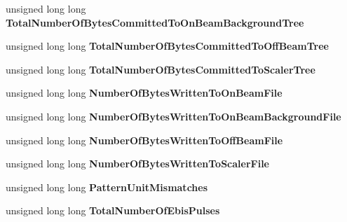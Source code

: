 \begin{DoxyCompactItemize}
\item 
\hypertarget{class_event_builder_a806f1763408486a9f46ff3a521476ca8}{unsigned long long {\bfseries Total\-Number\-Of\-Bytes\-Committed\-To\-On\-Beam\-Background\-Tree}}\label{class_event_builder_a806f1763408486a9f46ff3a521476ca8}

\item 
\hypertarget{class_event_builder_a66ea0d8b3123cc4cd3458528d30f17b6}{unsigned long long {\bfseries Total\-Number\-Of\-Bytes\-Committed\-To\-Off\-Beam\-Tree}}\label{class_event_builder_a66ea0d8b3123cc4cd3458528d30f17b6}

\item 
\hypertarget{class_event_builder_ab65f8dae52a68a6c61bc1e1e1bae996b}{unsigned long long {\bfseries Total\-Number\-Of\-Bytes\-Committed\-To\-Scaler\-Tree}}\label{class_event_builder_ab65f8dae52a68a6c61bc1e1e1bae996b}

\item 
\hypertarget{class_event_builder_a638590f2a3784f3a7208a1862fdde67c}{unsigned long long {\bfseries Number\-Of\-Bytes\-Written\-To\-On\-Beam\-File}}\label{class_event_builder_a638590f2a3784f3a7208a1862fdde67c}

\item 
\hypertarget{class_event_builder_acbb871d8b83c7f693710129c03186b8d}{unsigned long long {\bfseries Number\-Of\-Bytes\-Written\-To\-On\-Beam\-Background\-File}}\label{class_event_builder_acbb871d8b83c7f693710129c03186b8d}

\item 
\hypertarget{class_event_builder_aa9f7e586f862b480c5c66e09bd3e0385}{unsigned long long {\bfseries Number\-Of\-Bytes\-Written\-To\-Off\-Beam\-File}}\label{class_event_builder_aa9f7e586f862b480c5c66e09bd3e0385}

\item 
\hypertarget{class_event_builder_a5b85d0e5250b3cbb7a82525d77607558}{unsigned long long {\bfseries Number\-Of\-Bytes\-Written\-To\-Scaler\-File}}\label{class_event_builder_a5b85d0e5250b3cbb7a82525d77607558}

\item 
\hypertarget{class_event_builder_a1b4b4ff6bca480c5002ff184cb46e077}{unsigned long long {\bfseries Pattern\-Unit\-Mismatches}}\label{class_event_builder_a1b4b4ff6bca480c5002ff184cb46e077}

\item 
\hypertarget{class_event_builder_a9693e4181b4ab9f86a96a2f2da27d077}{unsigned long long {\bfseries Total\-Number\-Of\-Ebis\-Pulses}}\label{class_event_builder_a9693e4181b4ab9f86a96a2f2da27d077}


\end{DoxyCompactItemize}
